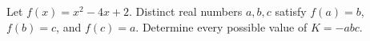 Let $f(x)=x^2-4x+2$. Distinct real numbers $a,b,c$ satisfy $f(a)=b$, $f(b)=c$, and $f(c)=a$. Determine every possible value of $K=-abc$.
